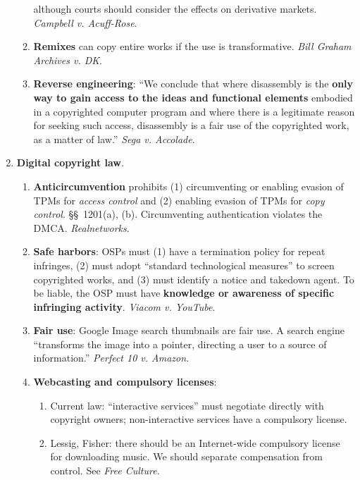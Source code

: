 \begin{enumerate}
\begin{enumerate}
        although courts should consider the effects on derivative markets.  
        \emph{Campbell v. Acuff-Rose}.
        \item \textbf{Remixes} can copy entire works if the use is 
        transformative. \emph{Bill Graham Archives v. DK}.
        \item \textbf{Reverse engineering}: ``We conclude that where 
        disassembly is the \textbf{only way to gain access to the ideas and 
        functional elements} embodied in a copyrighted computer program and 
        where there is a legitimate reason for seeking such access, 
        disassembly is a fair use of the copyrighted work, as a matter of 
        law.'' \emph{Sega v. Accolade}.
    \end{enumerate}
    \item \textbf{Digital copyright law}.
    \begin{enumerate}
        \item \textbf{Anticircumvention} prohibits (1) circumventing or 
        enabling evasion of TPMs for \emph{access control} and (2) enabling 
        evasion of TPMs for \emph{copy control}. \S\S\ 1201(a), (b).  
        Circumventing authentication violates the DMCA. \emph{Realnetworks}.
        \item \textbf{Safe harbors}: OSPs must (1) have a termination policy 
        for repeat infringes, (2) must adopt ``standard technological 
        measures'' to screen copyrighted works, and (3) must identify a notice 
        and takedown agent. To be liable, the OSP must have \textbf{knowledge 
        or awareness of specific infringing activity}. \emph{Viacom v.  
        YouTube}.
        \item \textbf{Fair use}: Google Image search thumbnails are fair use.  
        A search engine ``transforms the image into a pointer, directing a 
        user to a source of information.'' \emph{Perfect 10 v. Amazon}.
        \item \textbf{Webcasting and compulsory licenses}:
        \begin{enumerate}
            \item Current law: ``interactive services'' must negotiate 
            directly with copyright owners; non-interactive services have a 
            compulsory license.
            \item Lessig, Fisher: there should be an Internet-wide compulsory 
            license for downloading music. We should separate compensation 
            from control. See \emph{Free Culture}.

\end{enumerate}
\end{enumerate}
\end{enumerate}
